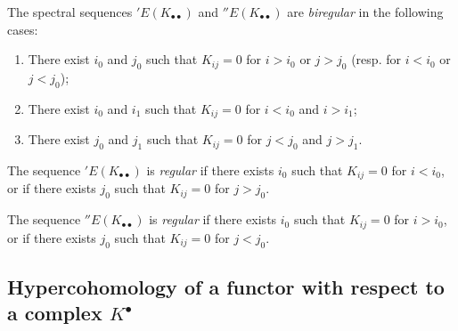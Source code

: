 \begin{env}[11.3.6]
\label{0.11.3.6}
The spectral sequences $'E(K_{\bullet\bullet})$ and $''E(K_{\bullet\bullet})$ are \emph{biregular} in the following cases:
\begin{enumerate}
  \item[(a)] There exist $i_0$ and $j_0$ such that $K_{ij}=0$ for $i>i_0$ or $j>j_0$ (resp. for $i<i_0$
    or $j<j_0$);
  \item[(b)] There exist $i_0$ and $i_1$ such that $K_{ij}=0$ for $i<i_0$ and $i>i_1$;
  \item[(c)] There exist $j_0$ and $j_1$ such that $K_{ij}=0$ for $j<j_0$ and $j>j_1$.
\end{enumerate}

The sequence $'E(K_{\bullet\bullet})$ is \emph{regular} if there exists $i_0$ such that $K_{ij}=0$ for $i<i_0$, or if there exists $j_0$ such that $K_{ij}=0$ for $j>j_0$.

The sequence $''E(K_{\bullet\bullet})$ is \emph{regular} if there exists $i_0$ such that $K_{ij}=0$ for $i>i_0$, or if there exists $j_0$ such that $K_{ij}=0$ for $j<j_0$.
\end{env}


\subsection{Hypercohomology of a functor with respect to a complex $K^{\bullet}$}
\label{subsection:0.11.4}

